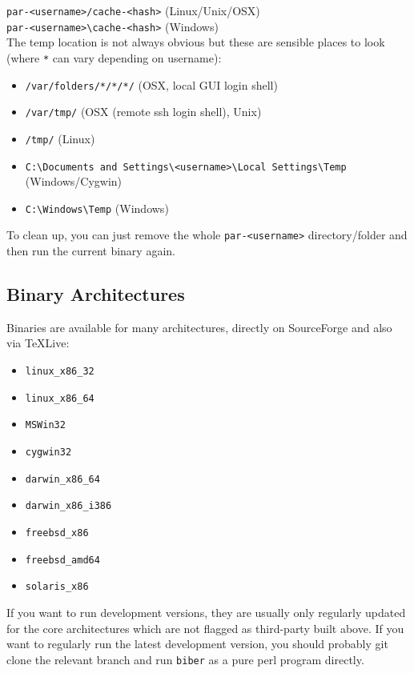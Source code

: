 \documentclass{ltxdockit}
\begin{document}
\noindent\verb+par-<username>/cache-<hash>+ (Linux/Unix/OSX)\\
\verb+par-<username>\cache-<hash>+ (Windows)\\[1ex]

\noindent The temp location is not always obvious but these are sensible
places to look (where \verb+*+ can vary depending on username):

\begin{itemize}
\item \verb+/var/folders/*/*/*/+ (OSX, local GUI login shell)
\item \verb+/var/tmp/+ (OSX (remote ssh login shell), Unix)
\item \verb+/tmp/+ (Linux)
\item \verb+C:\Documents and Settings\<username>\Local Settings\Temp+ (Windows/Cygwin)
\item \verb+C:\Windows\Temp+ (Windows)
\end{itemize}

\noindent To clean up, you can just remove the whole \verb+par-<username>+
directory/folder and then run the current binary again.

\subsection{Binary Architectures}

Binaries are available for many architectures, directly on SourceForge and
also via TeXLive:

\begin{itemize}
\item \verb+linux_x86_32+
\item \verb+linux_x86_64+
\item \verb+MSWin32+
\item \verb+cygwin32+
\item \verb+darwin_x86_64+
\item \verb+darwin_x86_i386+
\item \verb+freebsd_x86+\tpb
\item \verb+freebsd_amd64+\tpb
\item \verb+solaris_x86+\tpb
\end{itemize}

\noindent If you want to run development versions, they are usually only
regularly updated for the core architectures which are not flagged as
third-party built above. If you want to regularly run the latest
development version, you should probably git clone the relevant branch and
run \verb+biber+ as a pure perl program directly.
\end{document}
